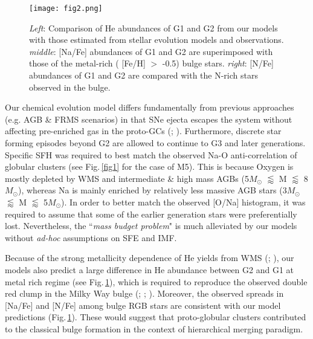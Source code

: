 \documentclass{iau}
\begin{document}
\begin{figure}[b]
\begin{center}
 \texttt{[image: fig2.png]} 
 \caption{\textit{Left}: Comparison of He abundances of G1 and G2 from our models with those estimated from stellar evolution models and observations. \textit{middle}: [Na/Fe] abundances of G1 and G2 are superimposed with those of the metal-rich ( [Fe/H] ${>}$ -0.5) bulge stars. \textit{right}: [N/Fe] abundances of G1 and G2 are compared with the N-rich stars observed in the bulge.}
   \label{fig2}
\end{center}
\end{figure}

Our chemical evolution model differs fundamentally from previous approaches (e.g. AGB \&  FRMS scenarios) in that SNe ejecta escapes the system without affecting pre-enriched gas in the proto-GCs (\cite[Tenorio-Tagle \etal\  2015]{Ten2015}; \cite[Silich \& Tenorio-Tagle 2017]{Silich2017}). Furthermore, discrete star forming episodes beyond G2 are allowed to continue to G3 and later generations. Specific SFH was required to best match the observed Na-O anti-correlation of globular clusters (see Fig.\,\ref{fig1} for the case of M5). This is because Oxygen is mostly depleted by WMS and intermediate \& high mass AGBs (5\(M_\odot\) ${\lessapprox}$ M ${\lessapprox}$ 8\(M_\odot\)), whereas Na is mainly enriched by relatively less massive AGB stars (3\(M_\odot\) ${\lessapprox}$ M ${\lessapprox}$ 5\(M_\odot\)). In order to better match the observed [O/Na] histogram, it was required to assume that some of the earlier generation stars were preferentially lost. Nevertheless, the ``\textit{mass budget problem}" is much alleviated by our models without \textit{ad-hoc} assumptions on SFE and IMF. 

Because of the strong metallicity dependence of He yields from WMS (\cite[Maeder 1992]{M92}; \cite[Meynet 2008]{Meynet2008}), our models also predict a large difference in He abundance between G2 and G1 at metal rich regime (see Fig.\,\ref{fig2}), which is required to reproduce the observed double red clump in the Milky Way bulge (\cite[Lee \etal\ 2015]{Lee2015}; \cite[Lee \& Jang 2016]{Lee2016}; \cite[Joo \etal\ 2017]{Joo2017}). Moreover, the observed spreads in [Na/Fe] and [N/Fe] among bulge RGB stars are consistent with our model predictions (Fig.\,\ref{fig2}). These would suggest that proto-globular clusters contributed to the classical bulge formation in the context of hierarchical merging paradigm. 
\end{document}
